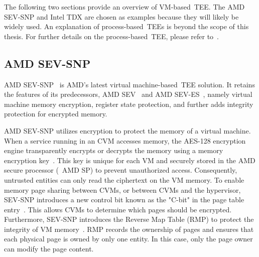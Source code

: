 The following two sections provide an overview of VM-based~\acrshort{TEE}. The AMD SEV-SNP and Intel TDX are chosen as examples because they will likely be widely used. An explanation of process-based~\acrshort{TEE}s is beyond the scope of this thesis. For further details on the process-based~\acrshort{TEE}, 
please refer to~\cite*{cryptoeprint:2016/086, 10.1145/2487726.2488370}.


\subsection{AMD SEV-SNP}

AMD SEV-SNP~\cite*{SEV_SNP_white_book} is AMD's latest virtual machine-based~\acrshort{TEE} solution. It retains the features of its predecessors, AMD SEV~\cite*{sev} and AMD SEV-ES~\cite*{sev_es}, namely virtual machine memory encryption, register state protection, and further adds integrity protection for 
encrypted memory.


AMD SEV-SNP utilizes encryption to protect the memory of a virtual machine. When a service running in an \acrshort{CVM} accesses memory, the AES-128 encryption engine transparently encrypts or decrypts the memory using a memory encryption key~\cite*{snp_Explained}.  This key is unique for each 
VM and securely stored in the AMD secure processor (~\acrshort{AMD SP}) to prevent unauthorized access. Consequently, untrusted entities can only read the ciphertext on the VM memory. To enable memory page sharing between \acrshort{CVM}s, or between \acrshort{CVM}s and the hypervisor, SEV-SNP introduces a new 
control bit known as the "C-bit" in the page table entry~\cite*{SEV_SNP_white_book}. This allows \acrshort{CVM}s to determine which pages should be encrypted. Furthermore, SEV-SNP introduces the Reverse Map Table (RMP) to protect the integrity of VM memory~\cite*{SEV_SNP_white_book}. 
RMP records the ownership of pages and ensures that each physical page is owned by only one entity. In this case, only the page owner can modify the page content.



